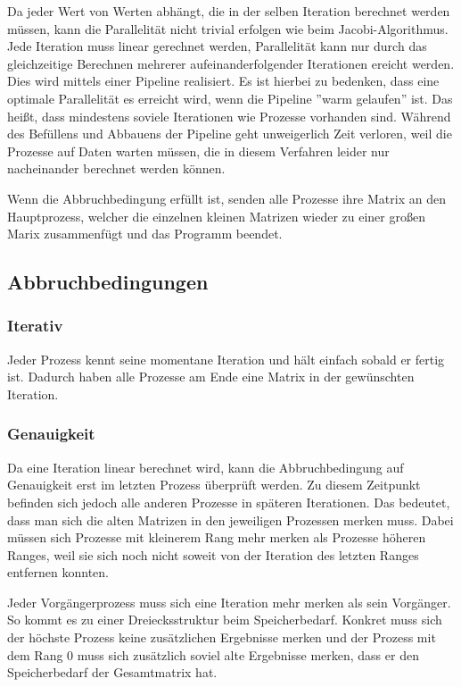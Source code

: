 \documentclass[a4paper]{scrartcl}
\begin{document}
Da jeder Wert von Werten abhängt, die in der selben Iteration berechnet werden
müssen, kann die Parallelität nicht trivial erfolgen wie beim Jacobi-Algorithmus.
Jede Iteration muss linear gerechnet werden, Parallelität kann nur durch das 
gleichzeitige Berechnen mehrerer aufeinanderfolgender Iterationen ereicht
werden. Dies wird mittels einer Pipeline realisiert.
Es ist hierbei zu bedenken, dass eine optimale Parallelität es erreicht wird,
wenn die Pipeline ''warm gelaufen'' ist. Das heißt, dass mindestens soviele
Iterationen wie Prozesse vorhanden sind. Während des Befüllens und Abbauens der
Pipeline geht unweigerlich Zeit verloren, weil die Prozesse auf Daten warten
müssen, die in diesem Verfahren leider nur nacheinander berechnet werden können.

Wenn die Abbruchbedingung erfüllt ist, senden alle Prozesse ihre Matrix an
den Hauptprozess, welcher die einzelnen kleinen Matrizen wieder zu einer großen
Marix zusammenfügt und das Programm beendet.

\subsection{Abbruchbedingungen}

\subsubsection{Iterativ}
Jeder Prozess kennt seine momentane Iteration und hält einfach sobald er 
fertig ist. Dadurch haben alle Prozesse am Ende eine Matrix in der 
gewünschten Iteration.

\subsubsection{Genauigkeit}
Da eine Iteration linear berechnet wird, kann die Abbruchbedingung auf
Genauigkeit erst im letzten Prozess überprüft werden. Zu diesem Zeitpunkt
befinden sich jedoch alle anderen Prozesse in späteren Iterationen. Das
bedeutet, dass man sich die alten Matrizen in den jeweiligen Prozessen merken
muss. Dabei müssen sich Prozesse mit kleinerem Rang mehr merken als Prozesse
höheren Ranges, weil sie sich noch nicht soweit von der Iteration des letzten 
Ranges entfernen konnten.

Jeder Vorgängerprozess muss sich eine Iteration 
mehr merken als sein Vorgänger. So kommt es zu einer Dreiecksstruktur beim 
Speicherbedarf. Konkret muss sich der höchste Prozess keine zusätzlichen 
Ergebnisse merken und der Prozess mit dem Rang 0 muss sich zusätzlich soviel 
alte Ergebnisse merken, dass er den Speicherbedarf der Gesamtmatrix hat.
\end{document}
